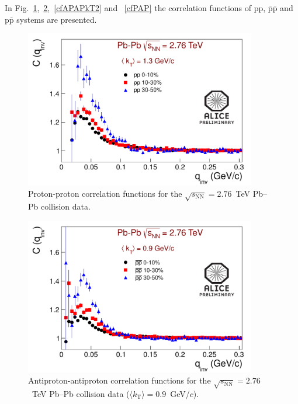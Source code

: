 In Fig.~\ref{cfPP},~\ref{cfAPAP},~\ref{cfAPAPkT2} and ~\ref{cfPAP} the correlation functions of pp, $\bar{\mathrm{p}}\bar{\mathrm{p}}$ and p$\bar{\mathrm{p}}$ systems are presented.
\clearpage
\begin{figure}%
  \centering
  \includegraphics[width=0.9\textwidth]{cf_PP_f1_kT2}
  \caption{Proton-proton correlation functions for the $\sqrt{s_{\mathrm{NN}}}=2.76$~TeV Pb--Pb collision data.}
  \label{cfPP}
\end{figure}
\begin{figure}%
  \centering
  \includegraphics[width=0.9\textwidth]{cf_APAP_f1}
  \caption{Antiproton-antiproton correlation functions for the $\sqrt{s_{\mathrm{NN}}}=2.76$~TeV Pb--Pb collision data ($\langle k_\mathrm{T}\rangle = 0.9$~GeV/$c$).}
  \label{cfAPAP}
\end{figure}
